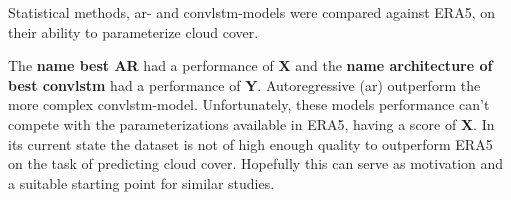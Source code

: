 Statistical methods, \acrfull{ar}- and \acrfull{convlstm}-models were compared against ERA5, on their ability to parameterize cloud cover.

The \textbf{name best AR} had a performance of \textbf{X} and the \textbf{name architecture of best convlstm} had a performance of \textbf{Y}. Autoregressive (\acrshort{ar}) outperform the more complex  \acrshort{convlstm}-model. Unfortunately, these models performance can't compete with the parameterizations available in ERA5, having a score of \textbf{X}. 
In its current state the dataset is not of high enough quality to outperform ERA5 on the task of predicting cloud cover. Hopefully this can serve as motivation and a suitable starting point for similar studies. 


\cleardoublepage